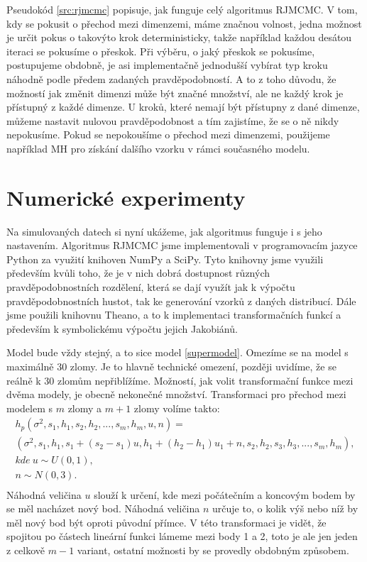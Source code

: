 \documentclass[czech,master,public,dept470,male,cpdeclaration,oneside, python]{diploma}
\begin{document}
Pseudokód \ref{src:rjmcmc} popisuje, jak funguje celý algoritmus RJMCMC. V tom, kdy se pokusit o přechod mezi dimenzemi, máme značnou volnost, jedna možnost je určit pokus o takovýto krok deterministicky, takže například každou desátou iteraci se pokusíme o přeskok. Při výběru, o jaký přeskok se pokusíme, postupujeme obdobně, je asi implementačně jednodušší vybírat typ kroku náhodně podle předem zadaných pravděpodobností. A to z toho důvodu, že možností jak změnit dimenzi může být značné množství, ale ne každý krok je přístupný z každé dimenze. U kroků, které nemají být přístupny z dané dimenze, můžeme nastavit nulovou pravděpodobnost a tím zajistíme, že se o ně nikdy nepokusíme. Pokud se nepokoušíme o přechod mezi dimenzemi, použijeme například MH pro získání dalšího vzorku v rámci současného modelu.
\section{Numerické experimenty}
Na simulovaných datech si nyní ukážeme, jak algoritmus funguje i s jeho nastavením. Algoritmus RJMCMC jsme implementovali v programovacím jazyce Python\cite{python} za využití knihoven NumPy\cite{numpy} a SciPy\cite{scipy}. Tyto knihovny jsme využili především kvůli toho, že je v nich dobrá dostupnost různých pravděpodobnostních rozdělení, která se dají využít jak k výpočtu pravděpodobnostních hustot, tak ke generování vzorků z daných distribucí. Dále jsme použili knihovnu Theano\cite{theano}, a to k implementaci transformačních funkcí a především k symbolickému výpočtu jejich Jakobiánů. \par
Model bude vždy stejný, a to sice model \ref{supermodel}. Omezíme se na model s maximálně 30 zlomy. Je to hlavně technické omezení, později uvidíme, že se reálně k 30 zlomům nepřiblížíme. Možností, jak volit transformační funkce mezi dvěma modely, je obecně nekonečné množství. Transformaci pro přechod mezi modelem s $m$ zlomy a $m+1$ zlomy volíme takto:
\begin{align*}
	h_p(\sigma^2, s_1, h_1, s_2, h_2, ..., s_m, h_m, u, n) = \\
	(\sigma^2, s_1, h_1, s_1 + (s_2 - s_1)u, h_1 + (h_2 - h_1)u_1 + n, s_2, h_2, s_3, h_3, ..., s_m, h_m), \\
	 kde\ u \sim U(0, 1), \\
	n \sim N(0, 3). \\
\end{align*}
Náhodná veličina $u$ slouží k určení, kde mezi počátečním a koncovým bodem by se měl nacházet nový bod. Náhodná veličina $n$ určuje to, o kolik výš nebo níž by měl nový bod být oproti původní přímce. V této transformaci je vidět, že spojitou po částech lineární funkci lámeme mezi body 1 a 2, toto je ale jen jeden z celkově $m-1$ variant, ostatní možnosti by se provedly obdobným způsobem.
\end{document}
